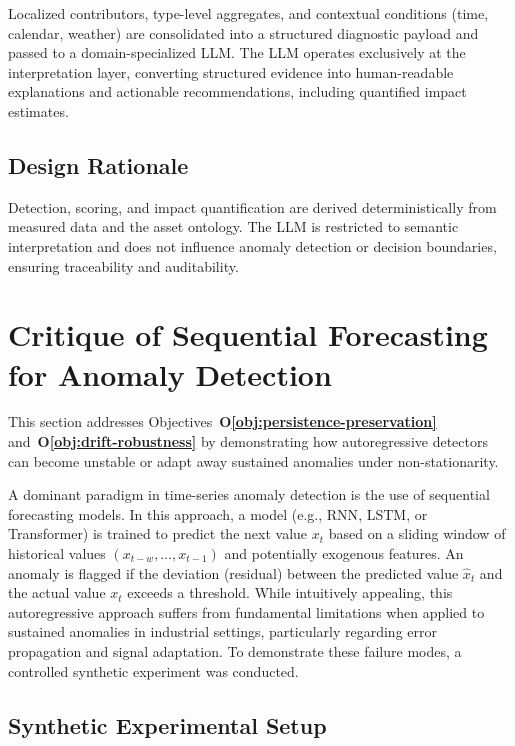Localized contributors, type-level aggregates, and contextual conditions (time, calendar,
weather) are consolidated into a structured diagnostic payload and passed to a
domain-specialized \ac{LLM}. The \ac{LLM} operates exclusively at the
interpretation layer, converting structured evidence into human-readable explanations
and actionable recommendations, including quantified impact estimates.

\subsection{Design Rationale}

Detection, scoring, and impact quantification are derived deterministically from measured
data and the asset ontology. The \ac{LLM} is restricted to semantic interpretation and does
not influence anomaly detection or decision boundaries, ensuring traceability and
auditability.



\section{Critique of Sequential Forecasting for Anomaly Detection}
\label{sec:critique-sequential}

This section addresses Objectives~\textbf{O\ref{obj:persistence-preservation}} and~\textbf{O\ref{obj:drift-robustness}} by demonstrating how autoregressive detectors can become unstable or adapt away sustained anomalies under non-stationarity.

A dominant paradigm in time-series anomaly detection is the use of sequential forecasting models. In this approach, a model (e.g., \ac{RNN}, \ac{LSTM}, or Transformer) is trained to predict the next value $x_t$ based on a sliding window of historical values $(x_{t-w}, \ldots, x_{t-1})$ and potentially exogenous features. An anomaly is flagged if the deviation (residual) between the predicted value $\hat{x}_t$ and the actual value $x_t$ exceeds a threshold. While intuitively appealing, this autoregressive approach suffers from fundamental limitations when applied to sustained anomalies in industrial settings, particularly regarding error propagation and signal adaptation. To demonstrate these failure modes, a controlled synthetic experiment was conducted.

\subsection{Synthetic Experimental Setup}

